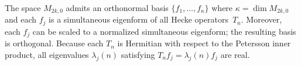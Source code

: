 The space $M_{2k,0}$ admits an orthonormal basis $\{f_1, \dots, f_\kappa\}$ where $\kappa = \dim M_{2k,0}$ and each $f_j$ is a simultaneous eigenform of all Hecke operators~$T_n$. Moreover, each $f_j$ can be scaled to a normalized simultaneous eigenform; the resulting basis is orthogonal. Because each $T_n$ is Hermitian with respect to the Petersson inner product, all eigenvalues $\lambda_j(n)$ satisfying $T_n f_j = \lambda_j(n) f_j$ are real.
